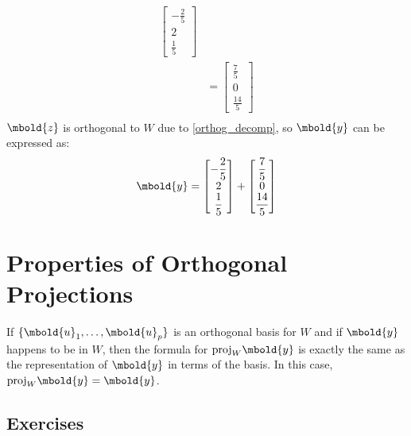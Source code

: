 \documentclass[12pt letter]{report}
\begin{document}
{{\begin{align*}
\begin{bmatrix}
                                                                 -\frac{2}{5} \\
                                                                 2            \\
                                                                 \frac{1}{5}
                                                               \end{bmatrix} \\
                & = \begin{bmatrix}
                      \frac{7}{5} \\
                      0           \\
                      \frac{14}{5}
                    \end{bmatrix}                                            \\
    \end{align*}
    $\mbold{z}$ is orthogonal to $W$ due to \ref{orthog_decomp}, so $\mbold{y}$ can be expressed as:
    \[
      \mbold{y} = \begin{bmatrix}
        \displaystyle -\frac{2}{5} \\
        \displaystyle 2            \\
        \displaystyle \frac{1}{5}
      \end{bmatrix}  +  \begin{bmatrix}
        \displaystyle \frac{7}{5} \\
        \displaystyle 0           \\
        \displaystyle \frac{14}{5}
      \end{bmatrix}
    \]
  }
}

\section{Properties of Orthogonal Projections}

If $\{\mbold{u}_1, \ldots, \mbold{u}_p\} $ is an orthogonal basis for $W$ and if $\mbold{y}$ happens to be in $W$, then
the formula for $\text{proj}_W \mbold{y}$ is exactly the same as the representation of $\mbold{y}$ in terms of the
basis. In this case, $\text{proj}_W \mbold{y} = \mbold{y}$.



\subsection{Exercises}
\end{document}
